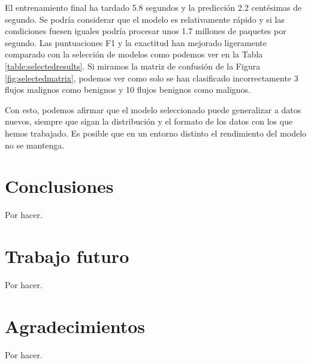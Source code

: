 \documentclass[10pt,a4paper,twoside]{article}
\begin{document}
\begin{multicols}{2}
    El entrenamiento final ha tardado 5.8 segundos y la predicción 2.2 centésimas de segundo. Se podría considerar que el modelo es relativamente rápido y si las condiciones fuesen iguales podría procesar unos 1.7 millones de paquetes por segundo. Las puntuaciones F1 y la exactitud han mejorado ligeramente comparado con la selección de modelos como podemos ver en la Tabla \ref{table:selectedresults}. Si miramos la matriz de confusión de la Figura \ref{fig:selectedmatrix}, podemos ver como solo se han clasificado incorrectamente 3 flujos malignos como benignos y 10 flujos benignos como malignos.

    Con esto, podemos afirmar que el modelo seleccionado puede generalizar a datos nuevos, siempre que sigan la distribución y el formato de los datos con los que hemos trabajado. Es posible que en un entorno distinto el rendimiento del modelo no se mantenga.
    
    \section{Conclusiones} \label{conclusiones}

    Por hacer.

    \section{Trabajo futuro} \label{tabajofuturo}

    Por hacer.

    \section{Agradecimientos} \label{agradecimientos}

    Por hacer.

    

\end{multicols}
\end{document}
